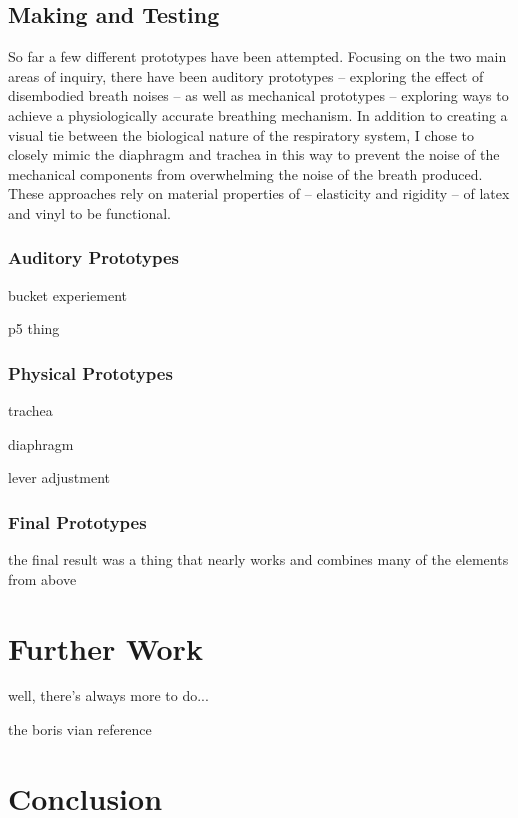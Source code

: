\documentclass[letterpaper]{article}
\begin{document}
\subsection{Making and Testing}

So far a few different prototypes have been attempted. Focusing on the two main areas of inquiry, there have been auditory prototypes -- exploring the effect of disembodied breath noises -- as well as mechanical prototypes -- exploring ways to achieve a physiologically accurate breathing mechanism. In addition to creating a visual tie between the biological nature of the respiratory system, I chose to closely mimic the diaphragm and trachea in this way to prevent the noise of the mechanical components from overwhelming the noise of the breath produced. These approaches rely on material properties of -- elasticity and rigidity -- of latex and vinyl to be functional.

\subsubsection{Auditory Prototypes}

bucket experiement

p5 thing

\subsubsection{Physical Prototypes}

trachea

diaphragm

lever adjustment

\subsubsection{Final Prototypes}

the final result was a thing that nearly works and combines many of the elements from above

\section{Further Work}

well, there's always more to do...

the boris vian reference 


\section{Conclusion}
\end{document}
